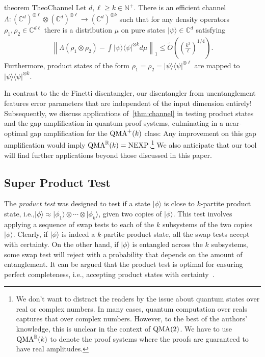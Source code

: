\documentclass[10pt,a4paper]{article}
\theoremstyle{remark}
\def\to{\rightarrow}
\newcommand{\ie}{i.e.,\xspace}
\newcommand{\R}{{\mathbb R}}
\newcommand{\C}{{\mathbb C}}
\newcommand{\norm}[1]{\ensuremath{\left\lVert #1 \right\rVert}}
\newcommand{\1}[1]{\mathds{1}{[#1]}}
\newcommand{\ket}[1]{\lvert #1\rangle}
\newcommand{\QMA}{\textup{QMA}}
\newcommand{\NEXP}{\textup{NEXP}}
\newcommand{\bra}[1]{\langle#1|}
\numberwithin{equation}{section}
\begin{document}
\begin{restatable}{theorem}
{TheoChannel}\label{thm:channel}
  Let $d,\ell \ge k \in \mathbb{N}^+$.
  There is an efficient channel $\Lambda \colon (\mathbb{C}^{d})^{\otimes \ell}\otimes (\mathbb{C}^{d})^{\otimes \ell} \to (\mathbb{C}^d)^{\otimes k}$
  such that for any density operators $\rho_1, \rho_2 \in \mathbb{C}^{d\ell}$ there is a distribution $\mu$ on pure states $\ket\psi \in \C^d$ satisfying
  \begin{align*}
    \norm{\Lambda(\rho_1 \otimes \rho_2) - \int \ket{\psi}\bra{\psi}^{\otimes k} d\mu}_1 \le \tilde O\left(\left(\frac{k^3}{\ell}\right)^{1/4}\right).
  \end{align*}
  Furthermore, product states of the form $\rho_1 = \rho_2 = \ket{\psi}\bra{\psi}^{\otimes \ell}$ are
  mapped to $\ket{\psi}\bra{\psi}^{\otimes k}$.
\end{restatable}


In contrast to the de Finetti disentangler, our disentangler from unentanglement features
error parameters that are independent of the input dimension entirely! 
%
Subsequently, we discuss applications of~\cref{thm:channel} in testing product states and
the gap amplification in quantum proof systems, culminating in a near-optimal gap amplification for the $\QMA^+(k)$ class: Any improvement on this gap amplification would imply $\QMA^\R(k)=\NEXP$.\footnote{
We don't want to distract the readers by the issue about quantum states over real or complex numbers.
In many cases, quantum computation over reals captures that over complex numbers. However, to the best of the authors' knowledge, this is unclear in the context of $\QMA(2)$. We have to use $\QMA^\R(k)$ to denote the proof systems where the proofs are guaranteed to have real amplitudes.}
%
We also anticipate that our tool will find further applications beyond those discussed in
this paper.

\subsection{Super Product Test}

The \emph{product test} was designed to test if a state $\ket{\phi}$ is close to $k$-partite
product state, \ie $\ket{\phi} \approx \ket{\phi_1} \otimes \cdots \otimes \ket{\phi_k}$, given
two copies of $\ket{\phi}$.
%
This test involves applying a sequence of swap tests to each of the $k$ subsystems of the two
copies $\ket\phi$.
%
Clearly, if $\ket\phi$ is indeed a $k$-partite product state, all the swap tests accept with certainty.
%
On the other hand, if $\ket\phi$ is entangled across the $k$ subsystems, some swap test will reject
with a probability that depends on the amount of entanglement.
%
It can be argued that the product test is optimal for ensuring perfect completeness, i.e., accepting
product states with certainty~\cite{HM13}. 
\end{document}

